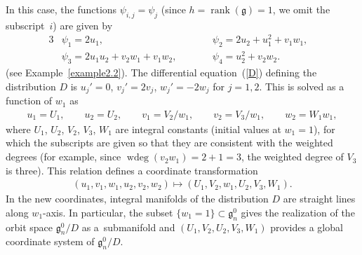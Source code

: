 \documentclass[10pt,a4paper]{amsart}
\numberwithin{equation}{section}
\begin{document}
 In this case, the functions $\psi _{i,j} = \psi _j$ (since $h=\operatorname{rank}(\mathfrak{g}) = 1$, we omit the subscript~$i$) are given by
\begin{alignat*}{3}
& \psi _1 = 2u_1 , \qquad && \psi _2 = 2u_2 + u_1^2 + v_1w_1, & \\
& \psi _3 = 2u_1u_2 + v_2w_1 + v_1w_2, \qquad && \psi _4 = u_2^2+v_2w_2.&
\end{alignat*}
(see Example~\ref{example2.2}). The dif\/ferential equation~(\ref{D}) def\/ining the distribution $D$ is $u_j' = 0$, $v_j' = 2v_j$, $w_j' = -2w_j$ for $j=1,2$. This is solved as a function of $w_1$ as
\begin{gather*}
u_1 = U_1, \qquad u_2 = U_2,\qquad v_1 = V_2/w_1,\qquad v_2 = V_3/w_1,\qquad w_2 = W_1 w_1,
\end{gather*}
where $U_1$, $U_2$, $V_2$, $V_3$, $W_1$ are integral constants (initial values at $w_1=1$), for which the subscripts are given so that they are consistent with the weighted degrees (for example, since $\operatorname{wdeg}(v_2w_1) = 2+1 = 3$, the weighted degree of $V_3$ is three). This relation def\/ines a coordinate transformation
\begin{gather*}
(u_1, v_1, w_1, u_2, v_2, w_2) \mapsto (U_1, V_2, w_1, U_2, V_3, W_1).
\end{gather*}
In the new coordinates, integral manifolds of the distribution $D$ are straight lines along $w_1$-axis. In particular, the subset $\{ w_1 = 1\} \subset \mathfrak{g}^0_n$ gives the realization of the orbit space $\mathfrak{g}^0_n/D$ as a~submanifold and $(U_1, V_2, U_2, V_3, W_1)$ provides a global coordinate system of $\mathfrak{g}^0_n/D$.
\end{document}
